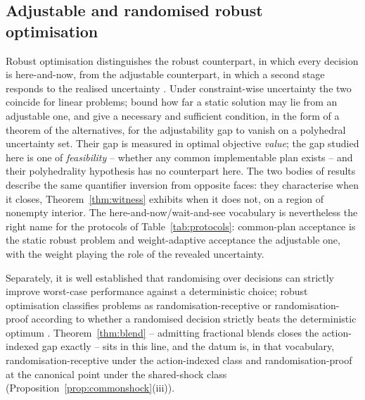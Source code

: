 \documentclass[preprint,11pt,authoryear]{elsarticle}
\theoremstyle{definition}
\theoremstyle{remark}
\begin{document}
\subsection{Adjustable and randomised robust optimisation}

Robust optimisation distinguishes the robust counterpart, in which every decision is here-and-now, from the adjustable counterpart, in which a second stage responds to the realised uncertainty \citep{BenTal2004,BenTal2009}. Under constraint-wise uncertainty the two coincide for linear problems; \citet{BertsimasGoyal2010} bound how far a static solution may lie from an adjustable one, and \citet{WeiZhang2024} give a necessary and sufficient condition, in the form of a theorem of the alternatives, for the adjustability gap to vanish on a polyhedral uncertainty set. Their gap is measured in optimal objective \emph{value}; the gap studied here is one of \emph{feasibility} -- whether any common implementable plan exists -- and their polyhedrality hypothesis has no counterpart here. The two bodies of results describe the same quantifier inversion from opposite faces: they characterise when it closes, Theorem~\ref{thm:witness} exhibits when it does not, on a region of nonempty interior. The here-and-now/wait-and-see vocabulary is nevertheless the right name for the protocols of Table~\ref{tab:protocols}: common-plan acceptance is the static robust problem and weight-adaptive acceptance the adjustable one, with the weight playing the role of the revealed uncertainty.

Separately, it is well established that randomising over decisions can strictly improve worst-case performance against a deterministic choice; robust optimisation classifies problems as randomisation-receptive or randomisation-proof according to whether a randomised decision strictly beats the deterministic optimum \citep{Delage2019,KrauseRoperGolovin2011,VorobeychikLi2014,Sinha2018,Sessa2020}. Theorem~\ref{thm:blend} -- admitting fractional blends closes the action-indexed gap exactly -- sits in this line, and the datum is, in that vocabulary, randomisation-receptive under the action-indexed class and randomisation-proof at the canonical point under the shared-shock class (Proposition~\ref{prop:commonshock}(iii)).
\end{document}
